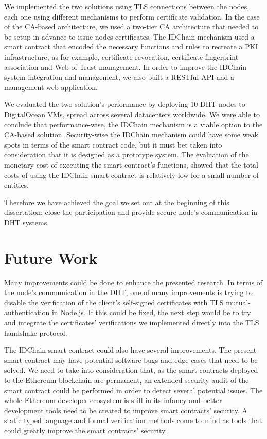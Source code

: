 We implemented the two solutions using TLS connections between the nodes, each one using different mechanisms to perform certificate validation.
In the case of the CA-based architecture, we used a two-tier CA architecture that needed to be setup in advance to issue nodes certificates.
The IDChain mechanism used a smart contract that encoded the necessary functions and rules to recreate a \ac{PKI} infrastructure, as for example, certificate revocation, certificate fingerprint association and Web of Trust management.
In order to improve the IDChain system integration and management, we also built a RESTful API and a management web application.

We evaluated the two solution's performance by deploying 10 DHT nodes to DigitalOcean \acp{VM}, spread across several datacenters worldwide.
We were able to conclude that performance-wise, the IDChain mechanism is a viable option to the CA-based solution.
Security-wise the IDChain mechanism could have some weak spots in terms of the smart contract code, but it must bet taken into consideration that it is designed as a prototype system.
The evaluation of the monetary cost of executing the smart contract's functions, showed that the total costs of using the IDChain smart contract is relatively low for a small number of entities.

Therefore we have achieved the goal we set out at the beginning of this dissertation: close the participation and provide secure node's communication in DHT systems.

\section{Future Work}
\label{section:future}

Many improvements could be done to enhance the presented research.
In terms of the node's communication in the DHT, one of many improvements is trying to disable the verification of the client's self-signed certificates with TLS mutual-authentication in Node.js.
If this could be fixed, the next step would be to try and integrate the certificates' verifications we implemented directly into the TLS handshake protocol.

The IDChain smart contract could also have several improvements.
The present smart contract may have potential software bugs and edge cases that need to be solved.
We need to take into consideration that, as the smart contracts deployed to the Ethereum blockchain are permanent, an extended security audit of the smart contract could be performed in order to detect several potential issues.
The whole Ethereum developer ecosystem is still in its infancy and better development tools need to be created to improve smart contracts' security.
A static typed language and formal verification methods come to mind as tools that could greatly improve the smart contracts' security.

